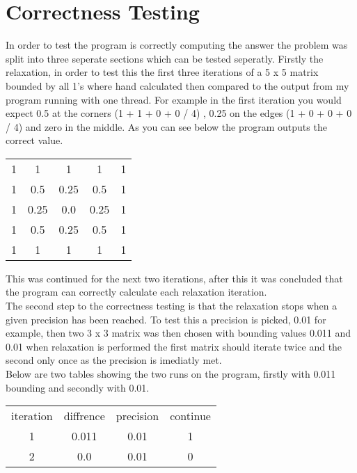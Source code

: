 \documentclass{article}
\begin{document}
\section{Correctness Testing}
In order to test the program is correctly computing the answer the problem was split
into three seperate sections which can be tested seperatly. Firstly the relaxation,
in order to test this the first three iterations of a 5 x 5 matrix bounded by all 1's
where hand calculated then compared to the output from my program running with one
thread. For example in the first iteration you would expect 0.5 at the corners (1 + 1 + 0 + 0 / 4)
, 0.25 on the edges (1 + 0 + 0 + 0 / 4) and zero in the middle. As you can see below the program outputs the correct
value.

\begin{center}
\begin{tabular}{ c c c c c }
 1 & 1 & 1 & 1 & 1 \\
 1 & 0.5 & 0.25 & 0.5 & 1 \\
 1 & 0.25 & 0.0 & 0.25 & 1 \\
 1 & 0.5 & 0.25 & 0.5 & 1 \\
 1 & 1 & 1 & 1 & 1 \\
\end{tabular}
\end{center}

This was continued for the next two iterations, after this it was concluded that
the program can correctly calculate each relaxation iteration.\\
The second step to the correctness testing is that the relaxation stops when a given
precision has been reached. To test this a precision is picked, 0.01 for example,
then two 3 x 3 matrix was then chosen with bounding values 0.011 and 0.01 when relaxation
is performed the first matrix should iterate twice and the second only once as the precision
is imediatly met.\\
Below are two tables showing the two runs on the program, firstly with 0.011 bounding
and secondly with 0.01.

\begin{center}
\begin{tabular}{ c c c c }
iteration & diffrence & precision & continue \\
 1 & 0.011 & 0.01 & 1\\
 2 & 0.0 & 0.01 & 0\\
\end{tabular}
\end{center}
\end{document}
